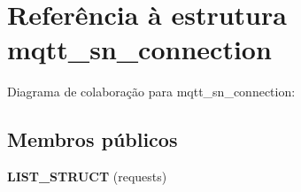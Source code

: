 \hypertarget{structmqtt__sn__connection}{\section{Referência à estrutura mqtt\+\_\+sn\+\_\+connection}
\label{structmqtt__sn__connection}
}


Diagrama de colaboração para mqtt\+\_\+sn\+\_\+connection\+:
\subsection*{Membros públicos}
\begin{DoxyCompactItemize}
\item 
\hypertarget{structmqtt__sn__connection_ab346420684659c5deaf7980b69e12430}{{\bfseries L\+I\+S\+T\+\_\+\+S\+T\+R\+U\+C\+T} (requests)}\label{structmqtt__sn__connection_ab346420684659c5deaf7980b69e12430}

\end{DoxyCompactItemize}
